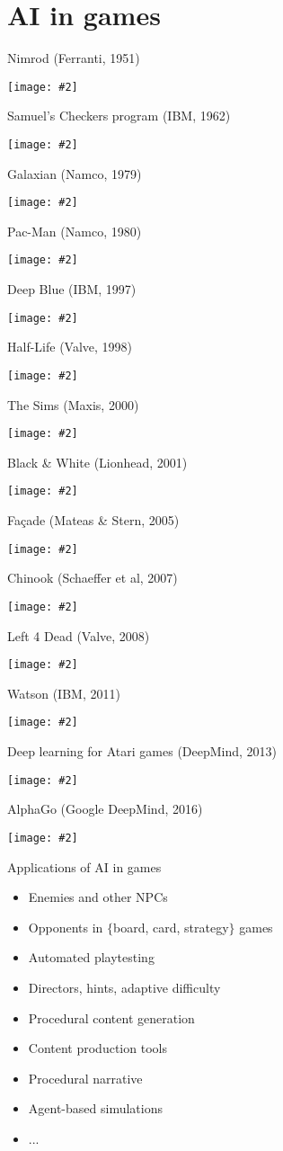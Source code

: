 \newcommand{\pictureslideb}[3]{
	\begin{frame}{#1}
		\begin{center}
			#3
			
			\vspace{6pt}
			
			\texttt{[image: \#2]}
		\end{center}
	\end{frame}
}

\newcommand{\pictureslide}[2]{
	\begin{frame}{#1}
		\begin{center}
			\texttt{[image: \#2]}
		\end{center}
	\end{frame}
}

\part{AI in games}
\frame{\partpage}

\pictureslide{Nimrod (Ferranti, 1951)}{nimrod}
\pictureslide{Samuel's Checkers program (IBM, 1962)}{samuel}
\pictureslide{Galaxian (Namco, 1979)}{galaxian}
\pictureslide{Pac-Man (Namco, 1980)}{pacman}
\pictureslide{Deep Blue (IBM, 1997)}{deep_blue}
\pictureslide{Half-Life (Valve, 1998)}{half_life}
\pictureslide{The Sims (Maxis, 2000)}{sims}
\pictureslide{Black \& White (Lionhead, 2001)}{black_white}
\pictureslide{Fa\c{c}ade (Mateas \& Stern, 2005)}{facade}
\pictureslide{Chinook (Schaeffer et al, 2007)}{chinook}
\pictureslide{Left 4 Dead (Valve, 2008)}{left_4_dead}
\pictureslide{Watson (IBM, 2011)}{watson}
\pictureslide{Deep learning for Atari games (DeepMind, 2013)}{deepmind_atari}
\pictureslide{AlphaGo (Google DeepMind, 2016)}{alphago}

\begin{frame}{Applications of AI in games}
	\begin{itemize}
		\pause\item Enemies and other NPCs
		\pause\item Opponents in $\{$board, card, strategy$\}$ games
		\pause\item Automated playtesting
		\pause\item Directors, hints, adaptive difficulty
		\pause\item Procedural content generation
		\pause\item Content production tools
		\pause\item Procedural narrative
		\pause\item Agent-based simulations
		\pause\item ...
	\end{itemize}
\end{frame}

